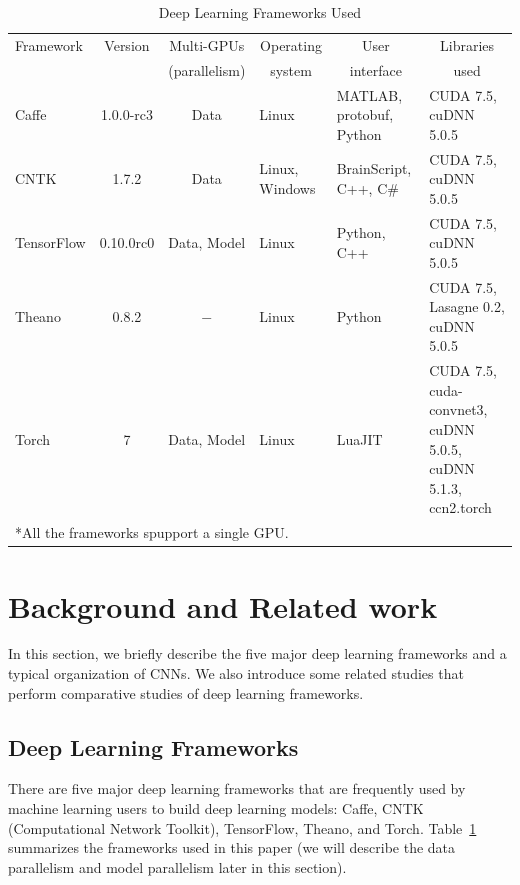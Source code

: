 \begin{table}[htbp]
\centering
\caption{Deep Learning Frameworks Used}
\label{table_framework}
\begin{scriptsize}
\begin{tabular}{|l|c|c|l|l|l|}
\hline
  Framework & Version & Multi-GPUs        & \multicolumn{1}{c|}{Operating} & \multicolumn{1}{c|}{User}      & \multicolumn{1}{c|}{Libraries}\\
            &         & (parallelism)     & \multicolumn{1}{c|}{system}    & \multicolumn{1}{c|}{interface} &  \multicolumn{1}{c|}{used} \\
\hline\hline
Caffe      & 1.0.0-rc3 & Data           & Linux          & MATLAB, protobuf, Python & CUDA 7.5, cuDNN 5.0.5 \\\hline
CNTK       & 1.7.2     & Data           & Linux, Windows & BrainScript, C++, C\#    & CUDA 7.5, cuDNN 5.0.5 \\\hline
TensorFlow & 0.10.0rc0 & Data, Model    & Linux          & Python, C++              & CUDA 7.5, cuDNN 5.0.5 \\\hline
Theano     & 0.8.2     & $-$            & Linux          & Python                   & CUDA 7.5, Lasagne 0.2, cuDNN 5.0.5 \\\hline
Torch      & 7         & Data, Model    & Linux          & LuaJIT                   & CUDA 7.5, cuda-convnet3, cuDNN 5.0.5, cuDNN 5.1.3, ccn2.torch \\\hline 
\multicolumn{4}{l}{*All the frameworks spupport a single GPU.}
\end{tabular}
\end{scriptsize}
\end{table}

\section{Background and Related work}
In this section, we briefly describe the five major deep learning frameworks and a typical organization of CNNs. We also introduce some related studies that perform comparative studies of deep learning frameworks.

\subsection{Deep Learning Frameworks}
There are five major deep learning frameworks that are frequently used by machine learning users to build deep learning models: Caffe\cite{jia2014caffe}, CNTK (Computational Network Toolkit)\cite{cntk}, TensorFlow\cite{tensorflow2015-whitepaper}, Theano\cite{DBLP:journals/corr/Al-RfouAAa16}, and Torch\cite{torch}. Table~\ref{table_framework} summarizes the frameworks used in this paper (we will describe the data parallelism and model parallelism later in this section). 

